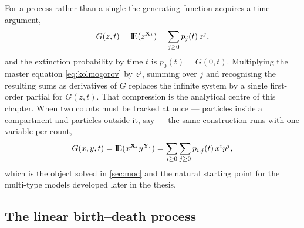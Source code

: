 For a process rather than a single \rv{} the generating function acquires a time
argument,
\begin{equation}
\label{eq:pgfprocess}
G(z,t) = {\rm I}\!{\rm E}(z^{{{\bf X}_t}}) = \sum_{j\ge0}p_j(t)\,z^j ,
\end{equation}
and the extinction probability by time $t$ is $p_0(t) = G(0,t)$. Multiplying the master
equation \cref{eq:kolmogorov} by $z^j$, summing over $j$ and recognising the resulting
sums as derivatives of $G$ replaces the infinite system by a single first-order partial
\de{} for $G(z,t)$. That compression is the analytical centre of this chapter. When two
counts must be tracked at once --- particles inside a compartment and particles outside
it, say --- the same construction runs with one variable per count,
\begin{equation}
\label{eq:pgfmulti}
G(x,y,t) = {\rm I}\!{\rm E}(x^{{{\bf X}_t}}y^{{{\bf Y}_t}}) = \sum_{i\ge0}\sum_{j\ge0}p_{i,j}(t)\,x^iy^j ,
\end{equation}
which is the object solved in \cref{sec:moc} and the natural starting point for the
multi-type models developed later in the thesis.

\subsection{The linear birth--death process}
\label{sec:lbd}

